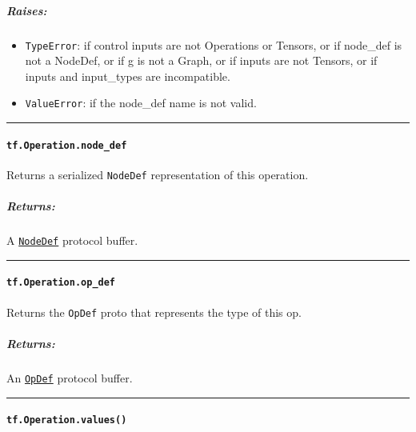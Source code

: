 \subparagraph{Raises: }\label{raises-7}

\begin{itemize}
\tightlist
\item
  \lstinline{TypeError}: if control inputs are not Operations or Tensors,
  or if node_def is not a NodeDef, or if g is not a Graph, or if inputs
  are not Tensors, or if inputs and input_types are incompatible.
\item
  \lstinline{ValueError}: if the node_def name is not valid.
\end{itemize}

\begin{center}\rule{0.5\linewidth}{\linethickness}\end{center}

\paragraph{\texorpdfstring{\lstinline{tf.Operation.node_def}
}{tf.Operation.node_def }}\label{tf.operation.nodeux5fdef}

Returns a serialized \lstinline{NodeDef} representation of this operation.

\subparagraph{Returns: }\label{returns-17}

A
\href{https://tensorflow.googlesource.com/tensorflow/+/master/tensorflow/core/framework/graph.proto}{\lstinline{NodeDef}}
protocol buffer.

\begin{center}\rule{0.5\linewidth}{\linethickness}\end{center}

\paragraph{\texorpdfstring{\lstinline{tf.Operation.op_def}
}{tf.Operation.op_def }}\label{tf.operation.opux5fdef}

Returns the \lstinline{OpDef} proto that represents the type of this op.

\subparagraph{Returns: }\label{returns-18}

An
\href{https://tensorflow.googlesource.com/tensorflow/+/master/tensorflow/core/framework/op_def.proto}{\lstinline{OpDef}}
protocol buffer.

\begin{center}\rule{0.5\linewidth}{\linethickness}\end{center}

\paragraph{\texorpdfstring{\lstinline{tf.Operation.values()}
}{tf.Operation.values() }}\label{tf.operation.values}

